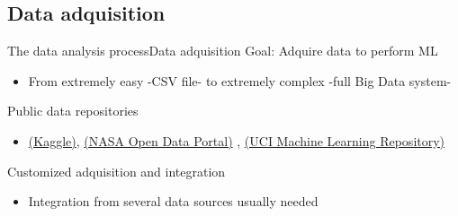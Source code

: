 \documentclass[10pt,compress]{beamer} %
\begin{document}
\subsection{Data adquisition}
\begin{frame}{The data analysis process}{Data adquisition}
	Goal: Adquire data to perform ML
		\begin{itemize}
		\item From extremely easy -CSV file- to extremely complex -full Big Data system-
		\end{itemize}

	Public data repositories
		\begin{itemize}
		\item \href{https://www.kaggle.com/}{(Kaggle)}, \href{https://data.nasa.gov/}{(NASA Open Data Portal)} , \href{https://archive.ics.uci.edu/ml/index.php}{(UCI Machine Learning Repository)}
		\end{itemize}
	Customized adquisition and integration
		\begin{itemize}
		\item Integration from several data sources usually needed
		\end{itemize}

		\begin{figure}
		\centering{
		\resizebox{0.6\textwidth}{!}{}}
		\end{figure}
\end{frame}
\end{document}
